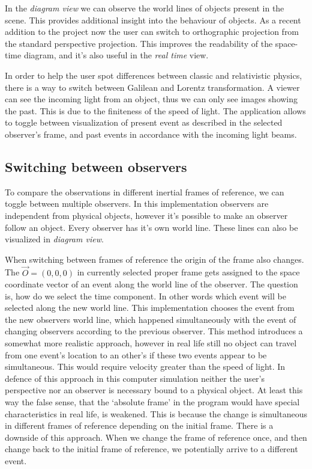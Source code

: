 \documentclass{egpubl}
\begin{document}
In the \emph{diagram view} we can observe the world lines of objects present in the scene. This provides additional insight into the behaviour of objects. As a recent addition to the project now the user can switch to orthographic projection from the standard perspective projection. This improves the readability of the space-time diagram, and it's also useful in the \emph{real time} view.

In order to help the user spot differences between classic and relativistic physics, there is a way to switch between Galilean \cite{KHGalilei} and Lorentz transformation. A viewer can see the incoming light from an object, thus we can only see images showing the past. This is due to the finiteness of the speed of light. The application allows to toggle between visualization of present event as described in the selected observer's frame, and past events in accordance with the incoming light beams.

\subsection{Switching between observers}
To compare the observations in different inertial frames of reference, we can toggle between multiple observers. In this implementation observers are independent from physical objects, however it's possible to make an observer follow an object. Every observer has it's own world line. These lines can also be visualized in \emph{diagram view}.

When switching between frames of reference the origin of the frame also changes. The $\vec{O} =(0,0,0)$ in currently selected proper frame gets assigned to the space coordinate vector of an event along the world line of the observer. The question is, how do we select the time component. In other words which event will be selected along the new world line. This implementation chooses the event from the new observers world line, which happened simultaneously with the event of changing observers according to the previous observer. This method introduces a somewhat more realistic approach, however in real life still no object can travel from one event's location to an other's if these two events appear to be simultaneous. This would require velocity greater than the speed of light. In defence of this approach in this computer simulation neither the user's perspective nor an observer is necessary bound to a physical object. At least this way the false sense, that the `absolute frame' in the program would have special characteristics in real life, is weakened. This is because the change is simultaneous in different frames of reference depending on the initial frame. There is a downside of this approach. When we change the frame of reference once, and then change back to the initial frame of reference, we potentially arrive to a different event.
\end{document}
